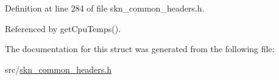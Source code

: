 Definition at line 284 of file skn\+\_\+common\+\_\+headers.\+h.



Referenced by get\+Cpu\+Temps().



The documentation for this struct was generated from the following file\+:\begin{DoxyCompactItemize}
\item 
src/\hyperlink{skn__common__headers_8h}{skn\+\_\+common\+\_\+headers.\+h}\end{DoxyCompactItemize}
